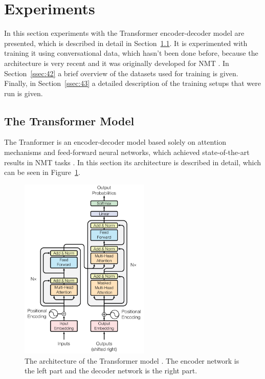 \documentclass[12pt]{article}
\begin{document}
\newpage\section{Experiments} \label{sec:experiments}
In this section experiments with the Transformer encoder-decoder model are presented, which is described in detail in Section~\ref{ssec:41}. It is experimented with training it using conversational data, which hasn't been done before, because the architecture is very recent and it was originally developed for NMT \cite{Vaswani:2017}. In Section~\ref{ssec:42} a brief overview of the datasets used for training is given. Finally, in Section~\ref{ssec:43} a detailed description of the training setups that were run is given.
\subsection{The Transformer Model} \label{ssec:41}
The Tranformer is an encoder-decoder model based solely on attention mechanisms and feed-forward neural networks, which achieved state-of-the-art results in NMT tasks \cite{Vaswani:2017}. In this section its architecture is described in detail, which can be seen in Figure~\ref{fig:transformer}.
\begin{figure}[H] 
	\centering
	\includegraphics[width=0.55\textwidth]{pics/transformer.png}
	\caption{The architecture of the Transformer model \cite{Vaswani:2017}. The encoder network is the left part and the decoder network is the right part.}
	\label{fig:transformer}
\end{figure}
\end{document}
